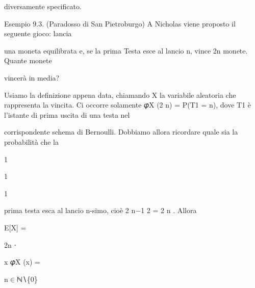 \documentclass[a4paper,portrait,12pt]{article}
\begin{document}
\begin{flushleft}
diversamente specificato.
\end{flushleft}


\begin{flushleft}
Esempio 9.3. (Paradosso di San Pietroburgo) A Nicholas viene proposto il seguente gioco: lancia
\end{flushleft}


\begin{flushleft}
una moneta equilibrata e, se la prima Testa esce al lancio n, vince 2n monete. Quante monete
\end{flushleft}


\begin{flushleft}
vincer\`{a} in media?
\end{flushleft}


\begin{flushleft}
Usiamo la definizione appena data, chiamando X la variabile aleatoria che rappresenta la vincita. Ci occorre solamente 𝜑X (2 n) = P(T1 = n), dove T1 \`{e} l'istante di prima uscita di una testa nel
\end{flushleft}


\begin{flushleft}
corrispondente schema di Bernoulli. Dobbiamo allora ricordare quale sia la probabilit\`{a} che la
\end{flushleft}


1


1


1


\begin{flushleft}
prima testa esca al lancio n-simo, cio\`{e} 2 n$-$1 2 = 2 n . Allora
\end{flushleft}


\begin{flushleft}
E[X] =
\end{flushleft}





\begin{flushleft}
2n ⋅
\end{flushleft}





\begin{flushleft}
x 𝜑X (x) =
\end{flushleft}


\begin{flushleft}
n$\in$ℕ∖\{0\}
\end{flushleft}
\end{document}
